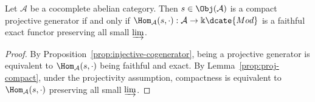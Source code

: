 \begin{proposition}\label{prop:proj-compact-gen}
	Let $\mathcal{A}$ be a cocomplete abelian category. Then
	$s\in\Obj(\mathcal{A})$ is a compact projective generator if and only if
	$\Hom_{\mathcal{A}}(s,\mathord\cdot):
	\mathcal{A}\to\Bbbk\dcate{Mod}$ is a faithful exact functor preserving all
	small $\varinjlim$.
\end{proposition}
\begin{proof}
	By Proposition~\ref{prop:injective-cogenerator}, being a projective
	generator is equivalent to $\Hom_{\mathcal{A}}(s,\mathord\cdot)$ being
	faithful and exact. By Lemma~\ref{prop:proj-compact}, under the
	projectivity assumption, compactness is equivalent to
	$\Hom_{\mathcal{A}}(s,\mathord\cdot)$ preserving all small
	$\varinjlim$.
\end{proof}

